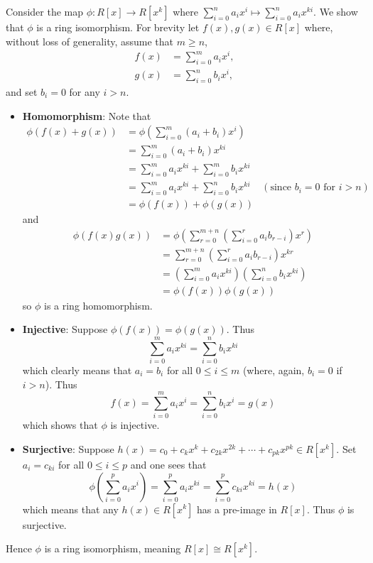 \begin{questions}
    \item Consider the map $\phi: R[x] \to R[x^k]$ where $\displaystyle \sum_{i=0}^n a_ix^i \mapsto \sum_{i=0}^na_ix^{ki}$. We show that $\phi$ is a ring isomorphism. For brevity let $f(x), g(x) \in R[x]$ where, without loss of generality, assume that $m \geq n$,
    \begin{align*}
        f(x) &= \sum_{i=0}^m a_ix^i,\\
        g(x) &= \sum_{i=0}^n b_ix^i,
    \end{align*}
    and set $b_i = 0$ for any $i > n$.
    \begin{itemize}
        \item \textbf{Homomorphism}: Note that
        \begin{align*}
            \phi(f(x) + g(x)) &= \phi\left(\sum_{i=0}^m(a_i+b_i)x^i\right)\\
            &= \sum_{i=0}^m(a_i+b_i)x^{ki}\\
            &= \sum_{i=0}^ma_ix^{ki} + \sum_{i=0}^mb_ix^{ki}\\
            &= \sum_{i=0}^ma_ix^{ki} + \sum_{i=0}^nb_ix^{ki} & (\text{since } b_i = 0 \text{ for } i > n)\\
            &= \phi(f(x)) + \phi(g(x))
        \end{align*}
        and
        \begin{align*}
            \phi(f(x)g(x)) &= \phi\left(\sum_{r=0}^{m+n}\left(\sum_{i=0}^ra_ib_{r-i}\right)x^r\right)\\
            &= \sum_{r=0}^{m+n}\left(\sum_{i=0}^ra_ib_{r-i}\right)x^{kr}\\
            &= \left(\sum_{i=0}^ma_ix^{ki}\right)\left(\sum_{i=0}^nb_ix^{ki}\right)\\
            &= \phi(f(x))\phi(g(x))
        \end{align*}
        so $\phi$ is a ring homomorphism.

        \item \textbf{Injective}: Suppose $\phi(f(x)) = \phi(g(x))$. Thus
        \[
            \sum_{i=0}^m a_ix^{ki} = \sum_{i=0}^n b_ix^{ki}
        \]
        which clearly means that $a_i = b_i$ for all $0 \leq i \leq m$ (where, again, $b_i = 0$ if $i > n$). Thus
        \[
            f(x) = \sum_{i=0}^m a_ix^i = \sum_{i=0}^n b_ix^i = g(x)
        \]
        which shows that $\phi$ is injective.

        \item \textbf{Surjective}: Suppose $h(x) = c_0 + c_kx^k + c_{2k}x^{2k} + \cdots + c_{pk}x^{pk} \in R[x^k]$. Set $a_i = c_{ki}$ for all $0 \leq i \leq p$ and one sees that
        \[
            \phi\left(\sum_{i=0}^pa_ix^i\right) = \sum_{i=0}^pa_ix^{ki} = \sum_{i=0}^pc_{ki}x^{ki} = h(x)
        \]
        which means that any $h(x) \in R[x^k]$ has a pre-image in $R[x]$. Thus $\phi$ is surjective.
    \end{itemize}
    Hence $\phi$ is a ring isomorphism, meaning $R[x] \cong R[x^k]$.


\end{questions}
